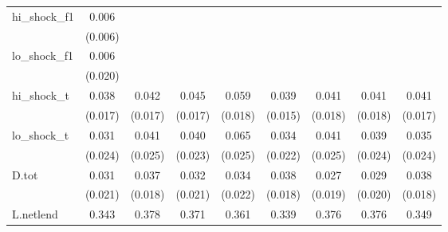 {\begin{tabular}{l*{8}{c}}
\addlinespace
hi\_shock\_f1 &       0.006         &                     &                     &                     &                     &                     &                     &                     \\
            &     (0.006)         &                     &                     &                     &                     &                     &                     &                     \\
\addlinespace
lo\_shock\_f1 &       0.006         &                     &                     &                     &                     &                     &                     &                     \\
            &     (0.020)         &                     &                     &                     &                     &                     &                     &                     \\
\addlinespace
hi\_shock\_t  &       0.038\sym{**} &       0.042\sym{**} &       0.045\sym{**} &       0.059\sym{***}&       0.039\sym{**} &       0.041\sym{**} &       0.041\sym{**} &       0.041\sym{**} \\
            &     (0.017)         &     (0.017)         &     (0.017)         &     (0.018)         &     (0.015)         &     (0.018)         &     (0.018)         &     (0.017)         \\
\addlinespace
lo\_shock\_t  &       0.031         &       0.041         &       0.040\sym{*}  &       0.065\sym{**} &       0.034         &       0.041         &       0.039         &       0.035         \\
            &     (0.024)         &     (0.025)         &     (0.023)         &     (0.025)         &     (0.022)         &     (0.025)         &     (0.024)         &     (0.024)         \\
\addlinespace
D.tot       &       0.031         &       0.037\sym{**} &       0.032         &       0.034         &       0.038\sym{**} &       0.027         &       0.029         &       0.038\sym{*}  \\
            &     (0.021)         &     (0.018)         &     (0.021)         &     (0.022)         &     (0.018)         &     (0.019)         &     (0.020)         &     (0.018)         \\
\addlinespace
L.netlend   &       0.343\sym{***}&       0.378\sym{***}&       0.371\sym{***}&       0.361\sym{***}&       0.339\sym{***}&       0.376\sym{***}&       0.376\sym{***}&       0.349\sym{***}\\

\end{tabular}}
